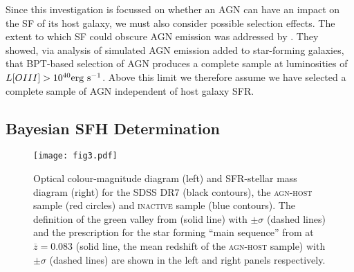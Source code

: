 \documentclass[useAMS,usenatbib]{mn2e}
\def\changed    {\color{nc} }
\def\changedbds    {\color{ncc} }
\def\newref    {\color{new} }
\begin{document}
Since this investigation is focussed on whether an AGN can have an impact on the SF of its host galaxy, we must also consider {\changed possible selection effects}. The extent to which SF {\changedbds could obscure AGN} emission was addressed by \cite{Sch2010}. They showed, via analysis of simulated AGN emission added to star-forming galaxies, that BPT-based selection of AGN produces a complete sample at luminosities of $L[OIII] > 10^{40} \rm{erg~s}^{-1}$. Above this limit we therefore assume we have selected a complete sample of AGN independent of host galaxy SFR.

\subsection{Bayesian SFH Determination}\label{starpy}

\begin{figure}
\centering
\texttt{[image: fig3.pdf]}
\caption{{\newref Optical colour-magnitude diagram (left) and SFR-stellar mass diagram (right) for the SDSS DR7 (black contours), the \textsc{agn-host} sample (red circles) and \textsc{inactive} sample (blue contours). The definition of the green valley from \citet{Baldry06} (solid line) with $\pm \sigma$ (dashed lines) and the prescription for the star forming ``main sequence'' from \citet{Peng10} at $\overline{z}=0.083$ (solid line, the mean redshift of the \textsc{agn-host} sample) with $\pm \sigma$ (dashed lines) are shown in the left and right panels respectively.}}
\label{cmdsfms}
\end{figure}
\end{document}

